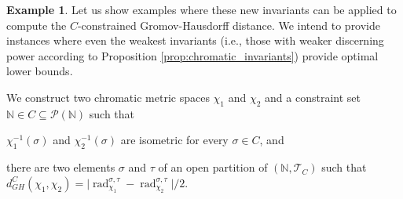 \documentclass[8pt,a4paper,oneside,english,english]{article}
\theoremstyle{plain}
\theoremstyle
{plain}
\theoremstyle{definition}
\newtheorem{example}[theorem]{Example}%
\newcommand{\N}{\mathbb{N}}
\newcommand{\Tau}{\mathcal T}
\newcommand{\GH}{d_{GH}}
\DeclareMathOperator{\rad}{rad}
\begin{document}
\begin{example}\label{ex:chromatic_invariants}
    Let us show examples where these new invariants can be applied to compute the $C$-constrained Gromov-Hausdorff distance. We intend to provide instances where even the weakest invariants (i.e., those with weaker discerning power according to Proposition \ref{prop:chromatic_invariants}) provide optimal lower bounds.

\begin{compactenum}[(i)]    
\item We construct two chromatic metric spaces $\chi_1$ and $\chi_2$ and a constraint set $\N\in C\subseteq\mathcal P(\N)$ such that
\begin{compactenum}[(a)]
\item $\chi_1^{-1}(\sigma)$ and $\chi_2^{-1}(\sigma)$ are isometric for every $\sigma\in C$, and
\item there are two elements $\sigma$ and $\tau$ of an open partition of $(\N,\Tau_C)$ such that $\GH^C(\chi_1,\chi_2)=\lvert\rad^{\sigma,\tau}_{\chi_1}-\rad^{\sigma,\tau}_{\chi_2}\rvert/2$.
\end{compactenum}


\end{compactenum}
\end{example}
\end{document}
